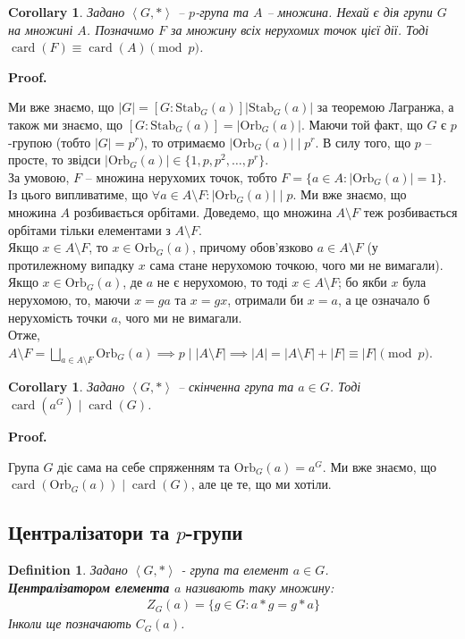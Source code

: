 \documentclass[a4paper, 10pt]{article}
\makeatletter
\theoremstyle{theoremdd}
\theoremstyle{theoremdd}
\newtheorem{definition}[theorem]{Definition}
\theoremstyle{theoremdd}
\theoremstyle{theoremdd}
\theoremstyle{theoremdd}
\theoremstyle{theoremdd}
\theoremstyle{theoremdd}
\theoremstyle{theoremdd}
\theoremstyle{theoremdd}
\theoremstyle{theoremdd}
\theoremstyle{theoremdd}
\theoremstyle{theoremdd}
\theoremstyle{theoremdd}
\theoremstyle{theoremdd}
\newtheorem{corollary}[theorem]{Corollary}
\theoremstyle{theoremdd}
\renewenvironment{proof}[1][Proof.\\]{\par
\pushQED{\hfill \qed}%
\normalfont \topsep6\p@\@plus6\p@\relax
\trivlist
\item\relax
{\bfseries
#1\@addpunct{.}}\hspace\labelsep\ignorespaces
}{%
\popQED\endtrivlist\@endpefalse
}
\DeclareMathOperator{\card}{card}
\newcommand\Orb{\text{Orb}}
\newcommand\Stab{\text{Stab}}
\makeatother
\begin{document}
\begin{corollary}
\label{amount_of_fixed_points}
Задано $\left< G,* \right>$ -- $p$-група та $A$ -- множина. Нехай є дія групи $G$ на множині $A$. Позначимо $F$ за множину всіх нерухомих точок цієї дії. Тоді $\card(F) \equiv \card(A) \pmod {p}$.
\end{corollary}

\begin{proof}
Ми вже знаємо, що $|G| = [G:\Stab_G(a)] |\Stab_G(a)|$ за теоремою Лагранжа, а також ми знаємо, що $[G:\Stab_G(a)] = |\Orb_G(a)|$. Маючи той факт, що $G$ є $p$-групою (тобто $|G| = p^r$), то отримаємо $|\Orb_G(a)| \mid p^r$. В силу того, що $p$ -- просте, то звідси $|\Orb_G(a)| \in \{1,p,p^2,\dots,p^r\}$.\\
За умовою, $F$ -- множина нерухомих точок, тобто $F = \{a \in A : |\Orb_G(a)| = 1\}$. Із цього випливатиме, що $\forall a \in A \setminus F: |\Orb_G(a)| \mid p$. Ми вже знаємо, що множина $A$ розбивається орбітами. Доведемо, що множина $A \setminus F$ теж розбивається орбітами тільки елементами з $A \setminus F$.\\
Якщо $x \in A \setminus F$, то $x \in \Orb_G(a)$, причому обов'язково $a \in A \setminus F$ (у протилежному випадку $x$ сама стане нерухомою точкою, чого ми не вимагали). Якщо $x \in \Orb_G(a)$, де $a$ не є нерухомою, то тоді $x \in A \setminus F$; бо якби $x$ була нерухомою, то, маючи $x = ga$ та $x = gx$, отримали би $x = a$, а це означало б нерухомість точки $a$, чого ми не вимагали.\\
Отже, $A \setminus F = \displaystyle\bigsqcup_{a \in A \setminus F} \Orb_G(a) \implies p \mid |A \setminus F| \implies |A| = |A \setminus F| + |F| \equiv |F| \pmod p$.
\end{proof}

\begin{corollary}
Задано $\left< G,*\right>$ -- скінченна група та $a \in G$. Тоді $\card(a^G) \mid \card(G)$.
\end{corollary}

\begin{proof}
Група $G$ діє сама на себе спряженням та $\Orb_G(a) = a^G$. Ми вже знаємо, що $\card(\Orb_G(a)) \mid \card(G)$, але це те, що ми хотіли.
\end{proof}

\subsection{Централізатори та $p$-групи}
\begin{definition}
Задано $\left< G, *\right>$ - група та елемент $a \in G$.\\
\textbf{Централізатором елемента $a$} називають таку множину:
\begin{align*}
Z_G(a) = \{g \in G: a*g = g*a\}
\end{align*}
Інколи ще позначають $C_G(a)$.
\end{definition}
\end{document}
